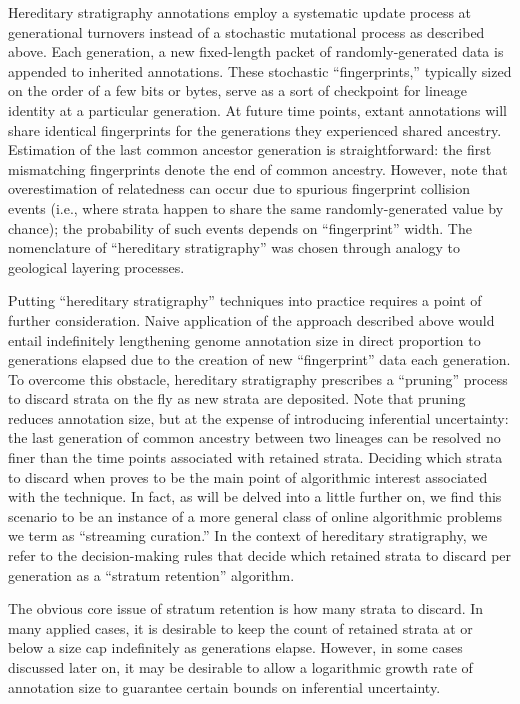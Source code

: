 Hereditary stratigraphy annotations employ a systematic update process at generational turnovers instead of a stochastic mutational process as described above.
Each generation, a new fixed-length packet of randomly-generated data is appended to inherited annotations.
These stochastic ``fingerprints,'' typically sized on the order of a few bits or bytes, serve as a sort of checkpoint for lineage identity at a particular generation.
At future time points, extant annotations will share identical fingerprints for the generations they experienced shared ancestry.
Estimation of the last common ancestor generation is straightforward: the first mismatching fingerprints denote the end of common ancestry.
However, note that overestimation of relatedness can occur due to spurious fingerprint collision events (i.e., where strata happen to share the same randomly-generated value by chance); the probability of such events depends on ``fingerprint'' width.
The nomenclature of ``hereditary stratigraphy'' was chosen through analogy to geological layering processes.

Putting ``hereditary stratigraphy'' techniques into practice requires a point of further consideration.
Naive application of the approach described above would entail indefinitely lengthening genome annotation size in direct proportion to generations elapsed due to the creation of new ``fingerprint'' data each generation.
To overcome this obstacle, hereditary stratigraphy prescribes a ``pruning'' process to discard strata on the fly as new strata are deposited.
Note that pruning reduces annotation size, but at the expense of introducing inferential uncertainty: the last generation of common ancestry between two lineages can be resolved no finer than the time points associated with retained strata.
Deciding which strata to discard when proves to be the main point of algorithmic interest associated with the technique.
In fact, as will be delved into a little further on, we find this scenario to be an instance of a more general class of online algorithmic problems we term as ``streaming curation.''
In the context of hereditary stratigraphy, we refer to the decision-making rules that decide which retained strata to discard per generation as a ``stratum retention'' algorithm.

The obvious core issue of stratum retention is how many strata to discard.
In many applied cases, it is desirable to keep the count of retained strata at or below a size cap indefinitely as generations elapse.
However, in some cases discussed later on, it may be desirable to allow a logarithmic growth rate of annotation size to guarantee certain bounds on inferential uncertainty.

